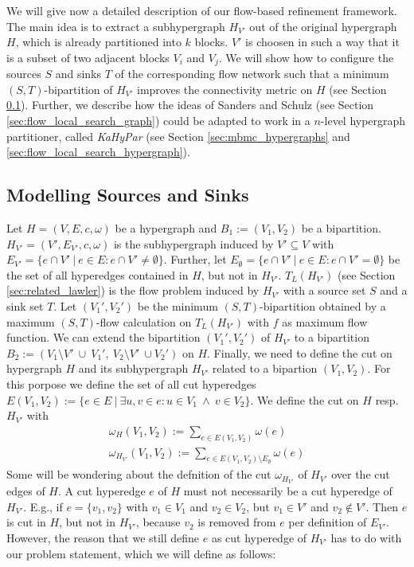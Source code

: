 We will give now a detailed description of our flow-based refinement framework. The main
idea is to extract a subhypergraph $H_{V'}$ out of the original hypergraph $H$, which is already
partitioned into $k$ blocks. $V'$ is choosen in such a way that it is a subset of two
adjacent blocks $V_i$ and $V_j$. We will show how to configure
the sources $S$ and sinks $T$ of the corresponding flow network such that
a minimum $(S,T)$-bipartition of $H_{V'}$ improves the connectivity metric on $H$
(see Section \ref{sec:source_and_sink}). Further, we describe how the ideas of
Sanders and Schulz \cite{sanders2011engineering} (see Section \ref{sec:flow_local_search_graph}) 
could be adapted to work in a $n$-level hypergraph partitioner, called \emph{KaHyPar}
(see Section \ref{sec:mbmc_hypergraphs} and \ref{sec:flow_local_search_hypergraph}). 

\subsection{Modelling Sources and Sinks}
\label{sec:source_and_sink}

Let $H = (V,E,c,\omega)$ be a hypergraph and $B_1 := (V_1, V_2)$ be a bipartition.
$H_{V'} = (V',E_{V'},c,\omega)$ is the subhypergraph
induced by $V' \subseteq V$ with $E_{V'} = \{ e \cap V'\ |\ e \in E: e \cap V' \neq \emptyset\}$. 
Further, let $E_{\emptyset} = \{ e \cap V'\ |\ e \in E: e \cap V' = \emptyset\} $
be the set of all hyperedges contained in $H$, but not in $H_{V'}$. $T_L(H_{V'})$ 
(see Section \ref{sec:related_lawler}) is the flow problem induced by $H_{V'}$ with a
source set $S$ and a sink set $T$. Let $(V_1',V_2')$ be the minimum $(S,T)$-bipartition
obtained by a maximum $(S,T)$-flow calculation on $T_L(H_{V'})$ with $f$ as maximum flow
function. We can extend the bipartition $(V_1',V_2')$ of $H_{V'}$ to a bipartition 
$B_2 := (V_1 \setminus V'\ \cup\ V_1',\ V_2 \setminus V'\ \cup V_2' )$ on $H$. Finally,
we need to define the cut on hypergraph $H$ and its subhypergraph $H_{V'}$ related to a
bipartion $(V_1,V_2)$. For this porpose we define the set of all cut hyperedges
$E(V_1,V_2) := \{e \in E\ |\ \exists u,v \in e: u \in V_1\ \land\ v \in V_2\}$.
We define the cut on $H$ resp. $H_{V'}$ with
\begin{align*}
\omega_H(V_1,V_2) := \sum_{e \in E(V_1,V_2)} \omega(e) \\
\omega_{H_{V'}}(V_1,V_2) := \sum_{e \in E(V_1,V_2) \setminus E_{\emptyset}} \omega(e) 
\end{align*}
Some will be wondering about the defnition of the cut $\omega_{H_{V'}}$ of $H_{V'}$ over the
cut edges of $H$. A cut hyperedge $e$ of $H$ must not necessarily be a cut hyperedge
of $H_{V'}$. E.g., if $e = \{v_1,v_2\}$ with $v_1 \in V_1$ and $v_2 \in V_2$, but
$v_1 \in V'$ and $v_2 \notin V'$. Then $e$ is cut in $H$, but not in $H_{V'}$, because
$v_2$ is removed from $e$ per definition of $E_{V'}$. However, the reason that we still
define $e$ as cut hyperedge of $H_{V'}$ has to do with our problem statement, 
which we will define as follows:

